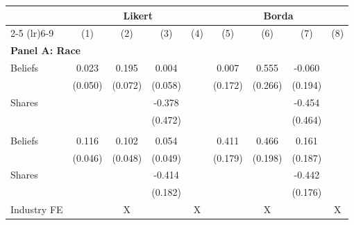 \begin{tabular}{lcccccccc}
\toprule
 & \multicolumn{4}{c}{Likert} & \multicolumn{4}{c}{Borda} \\
\cmidrule(lr){2-5} \cmidrule(lr){6-9}
 & (1) & (2) & (3) & (4) & (5) & (6) & (7) & (8)
\\
\midrule
\multicolumn{9}{l}{\textbf{Panel A: Race}} \\
Beliefs & 0.023 & 0.195 & 0.004 &  & 0.007 & 0.555 & -0.060 & 
\\
 & (0.050) & (0.072) & (0.058) &  & (0.172) & (0.266) & (0.194) & 
\\
Shares &  &  & -0.378 &  &  &  & -0.454 & 
\\
 &  &  & (0.472) &  &  &  & (0.464) & 
\\
\addlinespace
\multicolumn{9}{l}{\textbf{Panel B: Gender}} \\
Beliefs & 0.116 & 0.102 & 0.054 &  & 0.411 & 0.466 & 0.161 & 
\\
 & (0.046) & (0.048) & (0.049) &  & (0.179) & (0.198) & (0.187) & 
\\
Shares &  &  & -0.414 &  &  &  & -0.442 & 
\\
 &  &  & (0.182) &  &  &  & (0.176) & 
\\
\addlinespace
Industry FE &  & X &  & X &  & X &  & X
\\
\bottomrule
\end{tabular}
